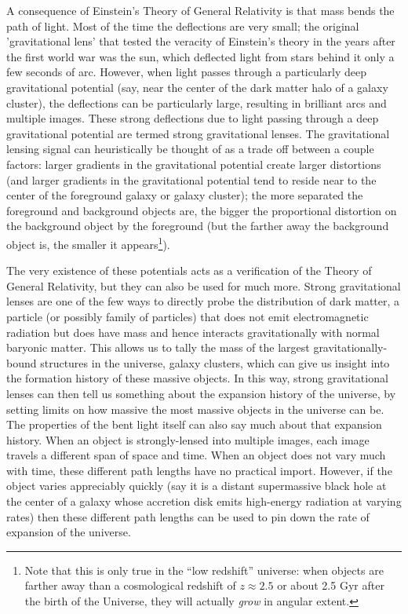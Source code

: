 \documentclass[10pt,twocolumn,letterpaper]{article}
\begin{document}
A consequence of Einstein's Theory of General Relativity
is that mass bends the path of light.\cite{Einstein:2007aa} Most of the time the deflections are very
small; the original 'gravitational lens' that tested the veracity of Einstein's
theory in the years after the first world war was the sun, which deflected
light from stars behind it only a few seconds of arc. However, when light
passes through a particularly deep gravitational potential (say, near the
center of the dark matter halo of a galaxy cluster), the deflections can be
particularly large, resulting in brilliant arcs and multiple images. These
strong deflections due to light passing through a deep gravitational potential
are termed strong gravitational lenses. The gravitational lensing signal can
heuristically be thought of as a trade off between a couple factors: larger
gradients in the gravitational potential create larger distortions (and larger
gradients in the gravitational potential tend to reside near to the center of
the foreground galaxy or galaxy cluster); the more separated the foreground and
background objects are, the bigger the proportional distortion on the
background object by the foreground (but the farther away the background object
is, the smaller it appears\footnote{Note that this is only true in the ``low
  redshift'' universe: when objects are farther away than a cosmological
  redshift of $z \approx 2.5$ or about 2.5 Gyr after the birth of the Universe,
they will actually \textit{grow} in angular extent.}).\cite{Kochanek:2006oz}

The very existence of these potentials acts as a verification of the Theory of
General Relativity, but they can also be used for much more. Strong
gravitational lenses are one of the few ways to directly probe the distribution
of dark matter, a particle (or possibly family of particles) that does not emit
electromagnetic radiation but does have mass and hence interacts
gravitationally with normal baryonic matter.\cite{Refsdal:1964aa} This allows us to tally the mass
of the largest gravitationally-bound structures in the universe, galaxy
clusters, which can give us insight into the formation history of these massive
objects. In this way, strong gravitational lenses can then tell us something
about the expansion history of the universe, by setting limits on how massive
the most massive objects in the universe can be. The properties of the bent
light itself can also say much about that expansion
history.\cite{Refsdal:1964ab, Kundic:1997aa, Barnacka:2014aa} When an object is
strongly-lensed into multiple images, each image travels a different span of
space and time. When an object does not vary much with time, these different
path lengths have no practical import. However, if the object varies
appreciably quickly (say it is a distant supermassive black hole at the center
of a galaxy whose accretion disk emits high-energy radiation at varying rates)
then these different path lengths can be used to pin down the rate of expansion
of the universe.
\end{document}
